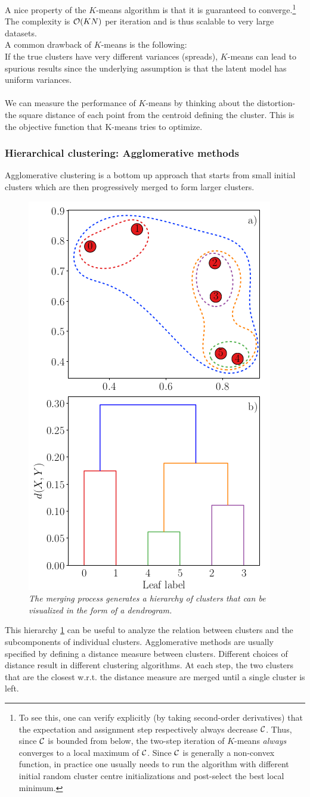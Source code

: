 A nice property of the $K$-means algorithm is that it is guaranteed to converge.\footnote{To see this, one can verify explicitly (by taking second-order derivatives) that the expectation and assignment step respectively always decrease $\mathcal{C}$. Thus, since $\mathcal{C}$ is bounded from below, the two-step iteration of $K$-means \emph{always} converges to a local maximum of $\mathcal{C}$. Since $\mathcal{C}$ is generally a non-convex function, in practice one usually needs to run the algorithm with different initial random cluster centre initializations and post-select the best local minimum.} The complexity is $\mathcal{O}(KN)$ per iteration and is thus scalable to very large datasets.\\
A common drawback of $K$-means is the following:\\
If the true clusters have very different variances (spreads), $K$-means can lead to spurious results since the underlying assumption is that the latent model has uniform variances.\\
\\
We can measure the performance of $K$-means by thinking about the distortion- the square distance of each point from the centroid defining the cluster. This is the objective function that K-means tries to optimize.

\subsubsection{Hierarchical clustering: Agglomerative methods}
\label{subsubsec:clusterPracticalHierarchical}
Agglomerative clustering is a bottom up approach that starts from small initial clusters which are then progressively merged to form larger clusters.
\begin{figure}[h!]
	\centering
	\includegraphics[width=0.4\linewidth]{gfx/HierarchicalCLustering}
	\caption{\itshape The merging process generates a hierarchy of clusters that can be visualized in the form of a dendrogram.}
	\label{fig:hierarchicalclustering}
\end{figure}
This hierarchy \ref{fig:hierarchicalclustering} can be useful to analyze the relation between clusters and the subcomponents of individual clusters. Agglomerative methods are usually specified by defining a distance measure between clusters. Different choices of distance result in different clustering algorithms. At each step, the two clusters that are the closest w.r.t. the distance measure are merged until a single cluster is left.

